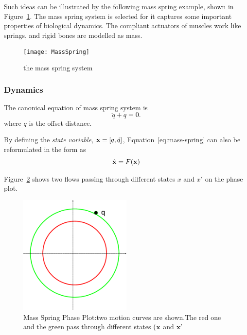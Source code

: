 Such ideas can be illustrated by the following mass spring example, shown in Figure~\ref{fig:massspring}.
The mass spring system is selected for it captures some important properties of biological dynamics.
The compliant actuators of muscles work like springs, and rigid bones are modelled as mass.


\begin{figure}[!htbp]
  \begin{center}
    \texttt{[image: MassSpring]}
    \caption{the mass spring system}
    \label{fig:massspring}
  \end{center}
\end{figure}

\subsubsection*{Dynamics}
The canonical equation of mass spring system is
\begin{equation}
\label{eq:mass-spring}
\ddot{q}+q=0.
\end{equation}
where $q$ is the offset distance.

By defining the \emph{state variable}, $\mathbf{x}=[q,\dot{q}]$, Equation~\ref{eq:mass-spring} can also be reformulated in the form as
\[
\dot{\mathbf{x}}=F(\mathbf{x})
\]

 Figure~\ref{fig:massSpringPhasePlot} shows two flows passing through different states $x$ and $x'$ on the phase plot.


\begin{figure}[!htbp]
  \begin{center}
     \includegraphics[width=0.5\textwidth]{MassSpringPhasePlot}
    \caption{Mass Spring Phase Plot:two motion curves are shown.The red one and the green pass through different states ($\mathbf{x}$ and $\mathbf{x}'$}
    \label{fig:massSpringPhasePlot}  
  \end{center}
\end{figure}

